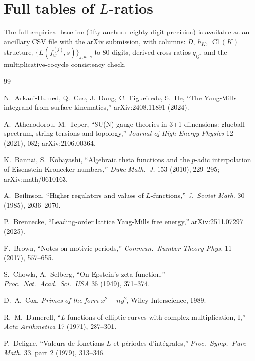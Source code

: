\documentclass[11pt]{amsart}
\theoremstyle{definition}
\theoremstyle{remark}
\DeclareMathOperator{\Cl}{Cl}
\begin{document}
\section{Full tables of $L$-ratios}\label{appx:tables}
The full empirical baseline (fifty anchors, eighty-digit precision)
is available as an ancillary CSV file with the arXiv submission, with
columns: $D$, $h_K$, $\Cl(K)$ structure,
$\{L(f_w^{(j)}, s)\}_{j, w, s}$ to 80 digits, derived cross-ratios
$q_{ij}$, and the multiplicative-cocycle consistency check.


\begin{thebibliography}{99}

 N.~Arkani-Hamed, Q.~Cao, J.~Dong, C.~Figueiredo, S.~He, ``The Yang-Mills integrand from surface kinematics,'' arXiv:2408.11891 (2024).

 A.~Athenodorou, M.~Teper, ``SU(N) gauge theories in 3+1 dimensions: glueball spectrum, string tensions and topology,'' \emph{Journal of High Energy Physics} 12 (2021), 082; arXiv:2106.00364.

 K.~Bannai, S.~Kobayashi, ``Algebraic theta functions and the $p$-adic interpolation of Eisenstein-Kronecker numbers,'' \emph{Duke Math.\ J.} 153 (2010), 229--295; arXiv:math/0610163.

 A.~Beilinson, ``Higher regulators and values of $L$-functions,'' \emph{J.\ Soviet Math.} 30 (1985), 2036--2070.

 P.~Brennecke, ``Leading-order lattice Yang-Mills free energy,'' arXiv:2511.07297 (2025).

 F.~Brown, ``Notes on motivic periods,'' \emph{Commun.\ Number Theory Phys.} 11 (2017), 557--655.

 S.~Chowla, A.~Selberg, ``On Epstein's zeta function,'' \emph{Proc.\ Nat.\ Acad.\ Sci.\ USA} 35 (1949), 371--374.

 D.~A.~Cox, \emph{Primes of the form $x^2 + ny^2$}, Wiley-Interscience, 1989.

 R.~M.~Damerell, ``$L$-functions of elliptic curves with complex multiplication, I,'' \emph{Acta Arithmetica} 17 (1971), 287--301.

 P.~Deligne, ``Valeurs de fonctions $L$ et p\'eriodes d'int\'egrales,'' \emph{Proc.\ Symp.\ Pure Math.} 33, part 2 (1979), 313--346.


\end{thebibliography}
\end{document}
